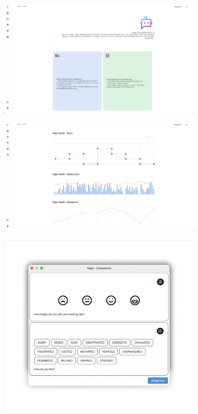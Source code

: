 \documentclass[12pt,a4paper]{report}
\begin{document}
      \begin{figure}[H]
        \centering
        \includegraphics[width=0.90\textwidth]{../figures/mockup/IP5_Yappi_Companion_Coach.pdf}
      \end{figure}

    \begin{figure}[H]
      \centering
      \includegraphics[width=0.90\textwidth]{../figures/mockup/IP5_Yappi_Companion_Health.pdf}
    \end{figure}

    \begin{figure}[H]
    \centering
    \includegraphics[width=0.90\textwidth]{../figures/mockup/IP5_Yappi_Companion_Intellij.pdf}
    \end{figure}
\end{document}
